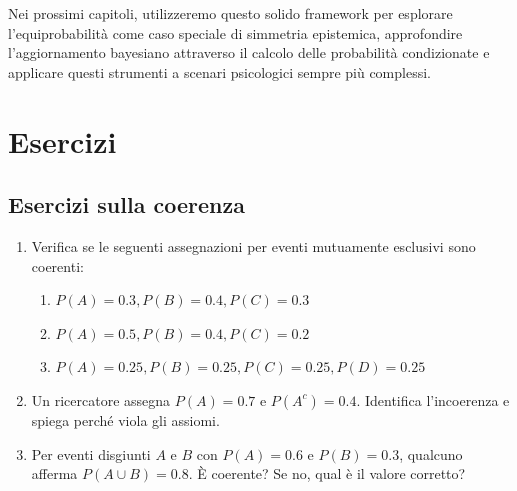 \documentclass[
  letterpaper,
  DIV=11,
  numbers=noendperiod,
  oneside]{scrreprt}
\providecommand{\tightlist}{%
  \setlength{\itemsep}{0pt}\setlength{\parskip}{0pt}}
\theoremstyle{definition}
\theoremstyle{plain}
\theoremstyle{definition}
\theoremstyle{remark}
\begin{document}
Nei prossimi capitoli, utilizzeremo questo solido framework per
esplorare l'equiprobabilità come caso speciale di simmetria epistemica,
approfondire l'aggiornamento bayesiano attraverso il calcolo delle
probabilità condizionate e applicare questi strumenti a scenari
psicologici sempre più complessi.

\section*{Esercizi}\label{esercizi}


\begin{tcolorbox}[enhanced jigsaw, arc=.35mm, breakable, colbacktitle=quarto-callout-important-color!10!white, opacityback=0, toprule=.15mm, rightrule=.15mm, colback=white, opacitybacktitle=0.6, leftrule=.75mm, coltitle=black, bottomtitle=1mm, left=2mm, toptitle=1mm, title=\textcolor{quarto-callout-important-color}{\faExclamation}\hspace{0.5em}{Problemi}, titlerule=0mm, bottomrule=.15mm, colframe=quarto-callout-important-color-frame]

\subsection{Esercizi sulla coerenza}\label{esercizi-sulla-coerenza}

\begin{enumerate}
\def\labelenumi{\arabic{enumi}.}
\item
  Verifica se le seguenti assegnazioni per eventi mutuamente esclusivi
  sono coerenti:

  \begin{enumerate}
  \def\labelenumii{\alph{enumii}.}
  \tightlist
  \item
    \(P(A) = 0.3, P(B) = 0.4, P(C) = 0.3\)
  \item
    \(P(A) = 0.5, P(B) = 0.4, P(C) = 0.2\)
  \item
    \(P(A) = 0.25, P(B) = 0.25, P(C) = 0.25, P(D) = 0.25\)
  \end{enumerate}
\item
  Un ricercatore assegna \(P(A) = 0.7\) e \(P(A^c) = 0.4\). Identifica
  l'incoerenza e spiega perché viola gli assiomi.
\item
  Per eventi disgiunti \(A\) e \(B\) con \(P(A) = 0.6\) e
  \(P(B) = 0.3\), qualcuno afferma \(P(A \cup B) = 0.8\). È coerente? Se
  no, qual è il valore corretto?
\end{enumerate}


\end{tcolorbox}
\end{document}
